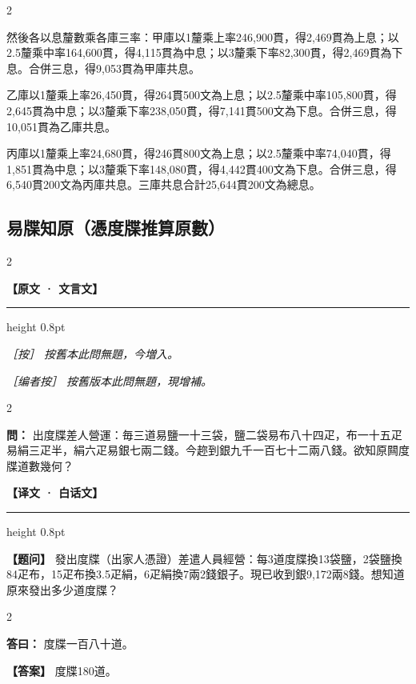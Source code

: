 \documentclass[11pt,a4paper]{article}
\newcommand{\ClassicalQuestion}[1]{\par\noindent\textbf{\color{problemcolor}問：}#1\par}
\newcommand{\ClassicalAnswer}[1]{\par\noindent\textbf{\color{answercolor}答曰：}#1\par}
\newcommand{\ClassicalNote}[1]{\par\noindent\textit{［按］#1}\par}
\newcommand{\ModernQuestion}[1]{\par\noindent\textbf{\color{modernlabel}【题问】}#1\par}
\newcommand{\ModernAnswer}[1]{\par\noindent\textbf{\color{answercolor}【答案】}#1\par}
\newcommand{\ModernNote}[1]{\par\noindent\textit{\color{notecolor}［编者按］#1}\par}
\newcommand{\ClassicalHeader}{%
  \begin{center}\textbf{\color{headerclassical}【原文 · 文言文】}\end{center}
  \vspace{-0.5em}
  \hrule height 0.8pt
  \vspace{0.5em}
}
\newcommand{\ModernHeader}{%
  \begin{center}\textbf{\color{headermodern}【译文 · 白话文】}\end{center}
  \vspace{-0.5em}
  \hrule height 0.8pt
  \vspace{0.5em}
}
\begin{document}
\begin{paracol}{2}
{然後各以息釐數乘各庫三率：甲庫以1釐乘上率246,900貫，得2,469貫為上息；以2.5釐乘中率164,600貫，得4,115貫為中息；以3釐乘下率82,300貫，得2,469貫為下息。合併三息，得9,053貫為甲庫共息。

乙庫以1釐乘上率26,450貫，得264貫500文為上息；以2.5釐乘中率105,800貫，得2,645貫為中息；以3釐乘下率238,050貫，得7,141貫500文為下息。合併三息，得10,051貫為乙庫共息。

丙庫以1釐乘上率24,680貫，得246貫800文為上息；以2.5釐乘中率74,040貫，得1,851貫為中息；以3釐乘下率148,080貫，得4,442貫400文為下息。合併三息，得6,540貫200文為丙庫共息。三庫共息合計25,644貫200文為總息。
}

\end{paracol}

\subsection*{\color{sectioncolor}易牒知原（憑度牒推算原數）}

\begin{paracol}{2}

\ClassicalHeader

\ClassicalNote{%
按舊本此問無題，今増入。}

\switchcolumn

\ModernNote{%
按舊版本此問無題，現增補。
}

\end{paracol}

\begin{paracol}{2}

\ClassicalQuestion{%
出度牒差人營運：毎三道易鹽一十三袋，鹽二袋易布八十四疋，布一十五疋易絹三疋半，絹六疋易銀七兩二錢。今趂到銀九千一百七十二兩八錢。欲知原闗度牒道數幾何？}

\switchcolumn

\ModernHeader

\ModernQuestion{%
發出度牒（出家人憑證）差遣人員經營：每3道度牒換13袋鹽，2袋鹽換84疋布，15疋布換3.5疋絹，6疋絹換7兩2錢銀子。現已收到銀9,172兩8錢。想知道原來發出多少道度牒？
}

\end{paracol}

\begin{paracol}{2}

\ClassicalAnswer{%
度牒一百八十道。}

\switchcolumn

\ModernAnswer{%
度牒180道。
}

\end{paracol}
\end{document}
